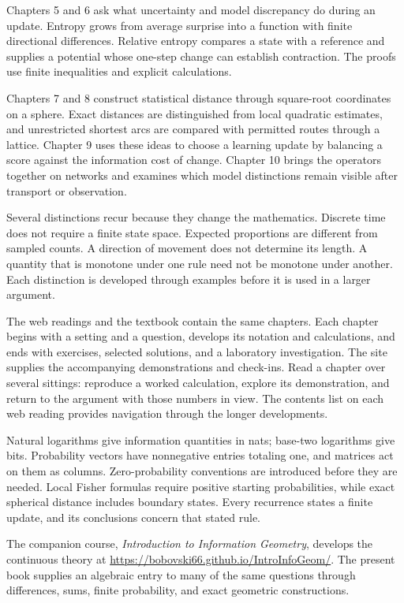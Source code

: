 \documentclass[11pt,oneside,openany]{book}
\theoremstyle{definition}
\theoremstyle{remark}
\numberwithin{equation}{chapter}
\begin{document}
Chapters 5 and 6 ask what uncertainty and model discrepancy do during an update. Entropy grows from average surprise into a function with finite directional differences. Relative entropy compares a state with a reference and supplies a potential whose one-step change can establish contraction. The proofs use finite inequalities and explicit calculations.

Chapters 7 and 8 construct statistical distance through square-root coordinates on a sphere. Exact distances are distinguished from local quadratic estimates, and unrestricted shortest arcs are compared with permitted routes through a lattice. Chapter 9 uses these ideas to choose a learning update by balancing a score against the information cost of change. Chapter 10 brings the operators together on networks and examines which model distinctions remain visible after transport or observation.

Several distinctions recur because they change the mathematics. Discrete time does not require a finite state space. Expected proportions are different from sampled counts. A direction of movement does not determine its length. A quantity that is monotone under one rule need not be monotone under another. Each distinction is developed through examples before it is used in a larger argument.

The web readings and the textbook contain the same chapters. Each chapter begins with a setting and a question, develops its notation and calculations, and ends with exercises, selected solutions, and a laboratory investigation. The site supplies the accompanying demonstrations and check-ins. Read a chapter over several sittings: reproduce a worked calculation, explore its demonstration, and return to the argument with those numbers in view. The contents list on each web reading provides navigation through the longer developments.

Natural logarithms give information quantities in nats; base-two logarithms give bits. Probability vectors have nonnegative entries totaling one, and matrices act on them as columns. Zero-probability conventions are introduced before they are needed. Local Fisher formulas require positive starting probabilities, while exact spherical distance includes boundary states. Every recurrence states a finite update, and its conclusions concern that stated rule.

The companion course, \emph{Introduction to Information Geometry}, develops the continuous theory at \url{https://bobovski66.github.io/IntroInfoGeom/}. The present book supplies an algebraic entry to many of the same questions through differences, sums, finite probability, and exact geometric constructions.
\end{document}

